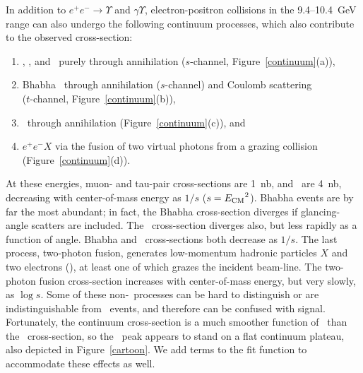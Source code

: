 \documentclass{cornell}
\begin{document}
In addition to $e^+e^- \to \Upsilon$ and $\gamma \Upsilon$,
electron-positron collisions in the 9.4--10.4~GeV range can also
undergo the following continuum processes, which also contribute to
the observed cross-section:  \renewcommand{\labelenumi}{\alph{enumi}.}
\begin{enumerate}

  \item \qqbar, \mumu, and \tautau\ purely through annihilation
    ($s$-channel, Figure~\ref{continuum}(a)),

  \item Bhabha \ee\ through annihilation ($s$-channel) and Coulomb
    scattering \\ (\mbox{$t$-channel,} Figure~\ref{continuum}(b)),

  \item \gamgam\ through annihilation (Figure~\ref{continuum}(c)), and

  \item $e^+e^- X$ via the fusion of two virtual photons from a
    grazing collision (Figure~\ref{continuum}(d)).

\end{enumerate}
At these energies, muon- and tau-pair cross-sections are 1~nb, and
\qqbar\ are 4~nb, decreasing with center-of-mass energy as $1/s$ ($s =
{E_{\mbox{\scriptsize CM}}}^2$).  Bhabha events are by far the most abundant; in
fact, the Bhabha cross-section diverges if glancing-angle scatters are
included.  The \gamgam\ cross-section diverges also, but less rapidly
as a function of angle.  Bhabha and \gamgam\ cross-sections both
decrease as $1/s$.  The last process, two-photon fusion, generates
low-momentum hadronic particles $X$ and two electrons (\ee), at least
one of which grazes the incident beam-line.  The two-photon fusion
cross-section increases with center-of-mass energy, but very slowly,
as $\log s$.  Some of these non-\ups\ processes can be hard to
distinguish or are indistinguishable from \ups\ events, and therefore
can be confused with signal.  Fortunately, the continuum cross-section
is a much smoother function of \ecm\ than the \ups\ cross-section, so the
\ups\ peak appears to stand on a flat continuum plateau, also depicted
in Figure~\ref{cartoon}.  We add terms to the fit function to
accommodate these effects as well.
\end{document}
